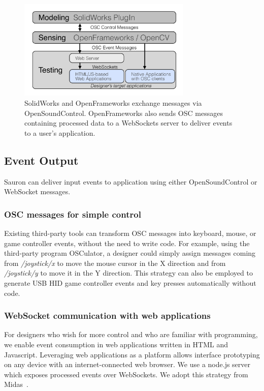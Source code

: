 \begin{figure}
\centering
\includegraphics[width=3.25in]{figures/sauron/arch2outlined.pdf}
\caption{SolidWorks and OpenFrameworks exchange messages via OpenSoundControl. OpenFrameworks also sends OSC messages containing processed data to a WebSockets server to deliver events to a user's application.}
\label{fig:sauron-arch}
\end{figure}

\subsection{Event Output}
Sauron can deliver input events to application using either OpenSoundControl or WebSocket messages.

\subsubsection{OSC messages for simple control}

Existing third-party tools can transform OSC messages into keyboard, mouse, or game controller events, without the need to write code. For example, using the third-party program OSCulator, a designer could simply assign messages coming from {\em /joystick/x} to move the mouse cursor in the X direction and from {\em /joystick/y} to move it in the Y direction. This strategy can also be employed to generate USB HID game controller events and key presses automatically without code.

\subsubsection{WebSocket communication with web applications}

For designers who wish for more control and who are familiar with programming, we enable event consumption in web applications written in HTML and Javascript. Leveraging web applications as a platform allows interface prototyping on any device with an internet-connected web browser. 
We use a node.js server which exposes processed events over WebSockets. We adopt this strategy from Midas~\cite{savage-midas}. 

